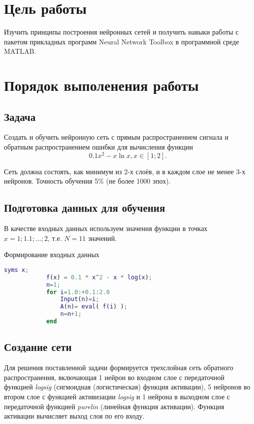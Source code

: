\section{Цель работы}
	Изучить принципы построения нейронных сетей и получить навыки  работы с пакетом прикладных программ Neural Network Toolbox в программной среде MATLAB.
\section{Порядок выполенения работы}
	\subsection{Задача}
		Создать и обучить нейронную сеть с прямым распространением сигнала и обратным  распространением ошибки для вычисления функции
		\[0.1x^2-x\ln{x}, x\in{[1;2]}.\]
		
		Сеть должна состоять, как минимум из 2-х слоёв, и в каждом слое не менее 3-х нейронов. Точность обучения 5\% (не более 1000 эпох).
		
		
	\subsection{Подготовка данных для обучения}
		В качестве входных данных используем значения функции в точках $ x = 1;1.1;...;2 $, т.е. $ N=11 $ значений. 
		
		\begin{ListingEnv}[H]
			\caption{Формирование входных данных}
			\label{list:first}
			\begin{lstlisting}[language={Matlab}]
			syms x;
			f(x) = 0.1 * x^2 - x * log(x);
			n=1;
			for i=1.0:+0.1:2.0
				Input(n)=i;
				A(n)= eval( f(i) );
				n=n+1;
			end
			\end{lstlisting}
		\end{ListingEnv}%
	
	\subsection{Создание сети}
		Для решения поставленной задачи формируется трехслойная сеть обратного распространения, включающая 1 нейрон во входном слое с передаточной функцией \textit{logsig} (сигмоидная (логистическая) функция активации), 5 нейронов во втором слое с функцией активизации \textit{logsig} и 1 нейрона в выходном слое с передаточной функцией \textit{purelin} (линейная функция активации). Функция активации вычисляет выход слоя по его входу.
		
